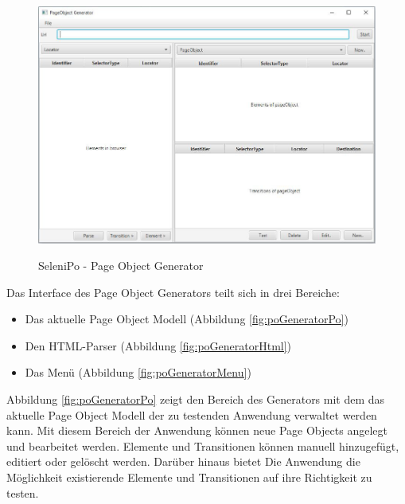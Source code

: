 \begin{figure}[htb]
  \centering  
  \includegraphics[scale=0.5]{img/poGenerator.JPG}\\
  \caption{SeleniPo - Page Object Generator}
  \label{fig:poGenerator}
\end{figure}



Das Interface des Page Object Generators teilt sich in drei Bereiche:

\begin{itemize}
	\item Das aktuelle Page Object Modell (Abbildung \ref{fig:poGeneratorPo})
	\item Den HTML-Parser (Abbildung \ref{fig:poGeneratorHtml})
	\item Das Menü (Abbildung \ref{fig:poGeneratorMenu})
\end{itemize}


Abbildung \ref{fig:poGeneratorPo} zeigt den Bereich des Generators mit dem das aktuelle Page Object Modell der zu testenden Anwendung verwaltet werden kann. Mit diesem Bereich der Anwendung können neue Page Objects angelegt und bearbeitet werden. Elemente und Transitionen können manuell hinzugefügt, editiert oder gelöscht werden. Darüber hinaus bietet Die Anwendung die Möglichkeit existierende Elemente und Transitionen auf ihre Richtigkeit zu testen.

